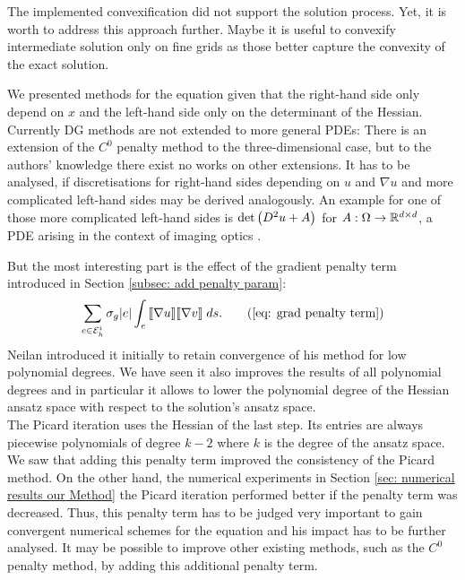The implemented convexification did not support the solution process. Yet, it is worth to address this approach further. Maybe it is useful to convexify intermediate solution only on fine grids as those better capture the convexity of the exact solution.

We presented methods for the \MA equation given that the right-hand side only depend on $x$ and the left-hand side only on the determinant of the Hessian. Currently DG methods are not extended to more general PDEs: There is an extension of the $C^0$ penalty method to the three-dimensional case\cite{BN2012}, but to the authors' knowledge there exist no works on other extensions. It has to be analysed, if discretisations for right-hand sides depending on $u$ and $\nabla u$ and more complicated left-hand sides may be derived analogously. An example for one of those more complicated left-hand sides is $\det{\left(D^2 u +A\right)}$ for $A:\Omega \rightarrow \mathbb{R}^{d \times d}$, a PDE arising in the context of imaging optics \cite{BHP2014}.
 
But the most interesting part is the effect of the gradient penalty term introduced in Section \ref{subsec: add penalty param}:
\begin{align}
	\sum_{e \in \edgesi} \sigma_g |e |\myIntS e {\jump{ \nabla u} \jump {\nabla v}}. \tag{\ref{eq: grad penalty term}}
\end{align}
Neilan introduced it initially to retain convergence of his method for low polynomial degrees. We have seen it also improves the results of all polynomial degrees and in particular it allows to lower the polynomial degree of the Hessian ansatz space with respect to the solution's ansatz space. \\
The Picard iteration uses the Hessian of the last step. Its entries are always piecewise polynomials of degree $k-2$ where $k$ is the degree of the ansatz space. We saw that adding this penalty term improved the consistency of the Picard method. On the other hand, the numerical experiments in Section \ref{sec: numerical results our Method} the Picard iteration performed better if the penalty term was decreased. Thus, this penalty term has to be judged very important to gain convergent numerical schemes for the \MA equation and his impact has to be further analysed. It may be possible to improve other existing methods, such as the $C^0$ penalty method, by adding this additional penalty term. 
